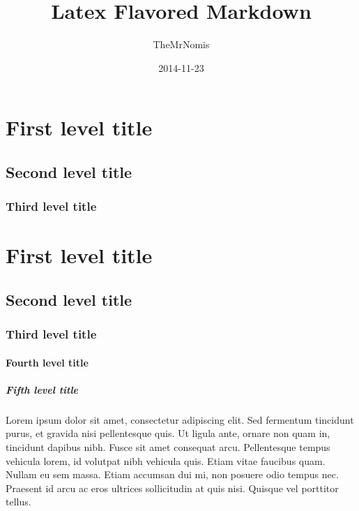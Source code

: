 \documentclass{report}
\begin{document}
        \begin{titlepage}
            \author{TheMrNomis}
            \title{Latex Flavored Markdown}
            \date{2014-11-23}

            \maketitle
        \end{titlepage}
        
        

\section{First level title}

\subsection{Second level title}

\subsubsection{Third level title}

\section{First level title}

\subsection{Second level title}

\subsubsection{Third level title}

\paragraph{Fourth level title}

\subparagraph{Fifth level title}

Lorem ipsum dolor sit amet, consectetur adipiscing elit. Sed fermentum tincidunt purus, et gravida nisi pellentesque quis. Ut ligula ante, ornare non quam in, tincidunt dapibus nibh. Fusce sit amet consequat arcu. Pellentesque tempus vehicula lorem, id volutpat nibh vehicula quis. Etiam vitae faucibus quam. Nullam eu sem massa. Etiam accumsan dui mi, non posuere odio tempus nec. Praesent id arcu ac eros ultrices sollicitudin at quis nisi. Quisque vel porttitor tellus.
\end{document}
